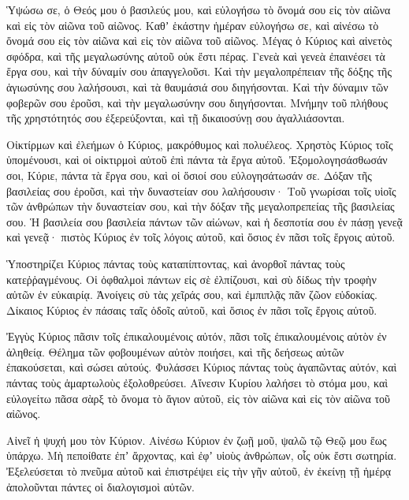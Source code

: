 \begin{spacing}{1.1}
\begin{multicols}{2}
Ὑψώσω σε, ὁ Θεός μου ὁ βασιλεύς μου, καὶ εὐλογήσω τὸ ὄνομά σου εἰς τὸν αἰῶνα καὶ εἰς τὸν αἰῶνα τοῦ αἰῶνος.
Καθʼ ἑκάστην ἡμέραν εὐλογήσω σε, καὶ αἰνέσω τὸ ὄνομά σου εἰς τὸν αἰῶνα καὶ εἰς τὸν αἰῶνα τοῦ αἰῶνος.
Μέγας ὁ Κύριος καὶ αἰνετὸς σφόδρα, καὶ τῆς μεγαλωσύνης αὐτοῦ οὐκ ἔστι πέρας.
Γενεὰ καὶ γενεὰ ἐπαινέσει τὰ ἔργα σου, καὶ τὴν δύναμίν σου ἀπαγγελοῦσι.
Καὶ τὴν μεγαλοπρέπειαν τῆς δόξης τῆς ἁγιωσύνης σου λαλήσουσι, καὶ τὰ θαυμάσιά σου διηγήσονται.
Καὶ τὴν δύναμιν τῶν φοβερῶν σου ἐροῦσι, καὶ τὴν μεγαλωσύνην σου διηγήσονται.
Μνήμην τοῦ πλήθους τῆς χρηστότητός σου ἐξερεύξονται, καὶ τῇ δικαιοσύνῃ σου ἀγαλλιάσονται.

Οἰκτίρμων καὶ ἐλεήμων ὁ Κύριος, μακρόθυμος καὶ πολυέλεος.
Χρηστὸς Κύριος τοῖς ὑπομένουσι, καὶ οἱ οἰκτιρμοὶ αὐτοῦ ἐπὶ πάντα τὰ ἔργα αὐτοῦ.
Ἐξομολογησάσθωσάν σοι, Κύριε, πάντα τὰ ἔργα σου, καὶ οἱ ὅσιοί σου εὐλογησάτωσάν σε.
Δόξαν τῆς βασιλείας σου ἐροῦσι, καὶ τὴν δυναστείαν σου λαλήσουσιν·
Τοῦ γνωρίσαι τοῖς υἱοῖς τῶν ἀνθρώπων τὴν δυναστείαν σου, καὶ τὴν δόξαν τῆς μεγαλοπρεπείας τῆς βασιλείας σου.
Ἡ βασιλεία σου βασιλεία πάντων τῶν αἰώνων, καὶ ἡ δεσποτία σου ἐν πάσῃ γενεᾷ καὶ γενεᾷ·
πιστὸς Κύριος ἐν τοῖς λόγοις αὐτοῦ, καὶ ὅσιος ἐν πᾶσι τοῖς ἔργοις αὐτοῦ.

Ὑποστηρίζει Κύριος πάντας τοὺς καταπίπτοντας, καὶ ἀνορθοῖ πάντας τοὺς κατεῤῥαγμένους.
Οἱ ὀφθαλμοὶ πάντων εἰς σὲ ἐλπίζουσι, καὶ σὺ δίδως τὴν τροφὴν αὐτῶν ἐν εὐκαιρίᾳ.
Ἀνοίγεις σὺ τὰς χεῖράς σου, καὶ ἐμπιπλᾷς πᾶν ζῶον εὐδοκίας.
Δίκαιος Κύριος ἐν πάσαις ταῖς ὁδοῖς αὐτοῦ, καὶ ὅσιος ἐν πᾶσι τοῖς ἔργοις αὐτοῦ.

Ἐγγὺς Κύριος πᾶσιν τοῖς ἐπικαλουμένοις αὐτόν, πᾶσι τοῖς ἐπικαλουμένοις αὐτὸν ἐν ἀληθείᾳ.
Θέλημα τῶν φοβουμένων αὐτὸν ποιήσει, καὶ τῆς δεήσεως αὐτῶν ἐπακούσεται, καὶ σώσει αὐτούς.
Φυλάσσει Κύριος πάντας τοὺς ἀγαπῶντας αὐτόν, καὶ πάντας τοὺς ἁμαρτωλοὺς ἐξολοθρεύσει.
Αἴνεσιν Κυρίου λαλήσει τὸ στόμα μου, καὶ εὐλογείτω πᾶσα σὰρξ τὸ ὄνομα τὸ ἅγιον αὐτοῦ, εἰς τὸν αἰῶνα καὶ εἰς τὸν αἰῶνα τοῦ αἰῶνος.

Αἰνεῖ ἡ ψυχή μου τὸν Κύριον.
Αἰνέσω Κύριον ἐν ζωῇ μοῦ, ψαλῶ τῷ Θεῷ μου ἕως ὑπάρχω.
Μὴ πεποίθατε ἐπʼ ἄρχοντας, καὶ ἐφʼ υἱοὺς ἀνθρώπων, οἷς οὐκ ἔστι σωτηρία.
Ἐξελεύσεται τὸ πνεῦμα αὐτοῦ καὶ ἐπιστρέψει εἰς τὴν γῆν αὐτοῦ, ἐν ἐκείνῃ τῇ ἡμέρᾳ ἀπολοῦνται πάντες οἱ διαλογισμοὶ αὐτῶν.


\end{multicols}
\end{spacing}
